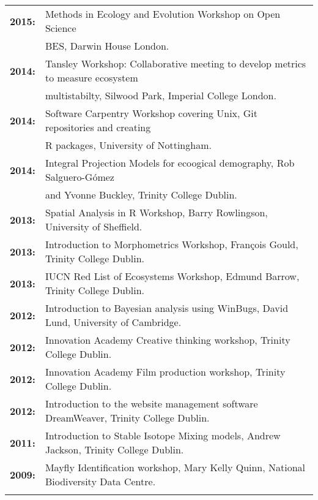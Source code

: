 \documentclass[10pt,a4paper]{article}
\begin{document}
\begin{tabular}{ll}
\textbf{2015:} & Methods in Ecology and Evolution Workshop on Open Science\\
& BES, Darwin House London.\\
\textbf{2014:} & Tansley Workshop: Collaborative meeting to develop metrics to measure ecosystem\\
&multistabilty, Silwood Park, Imperial College London.\\
\textbf{2014:} & Software Carpentry Workshop covering Unix, Git repositories and creating\\
&R packages, University of Nottingham.\\
\textbf{2014:} & Integral Projection Models for ecoogical demography, Rob Salguero-Gómez\\
&and Yvonne Buckley, Trinity College Dublin.\\
\textbf{2013:} & Spatial Analysis in R Workshop, Barry Rowlingson, University of Sheffield.\\
\textbf{2013:} & Introduction to Morphometrics Workshop, François Gould, Trinity College Dublin.\\
\textbf{2013:} & IUCN Red List of Ecosystems Workshop, Edmund Barrow, Trinity College Dublin.\\
\textbf{2012:} & Introduction to Bayesian analysis using WinBugs, David Lund, University of Cambridge.\\
\textbf{2012:} & Innovation Academy Creative thinking workshop, Trinity College Dublin.\\
\textbf{2012:} & Innovation Academy Film production workshop, Trinity College Dublin.\\
\textbf{2012:} & Introduction to the website management software DreamWeaver, Trinity College Dublin.\\
\textbf{2011:} & Introduction to Stable Isotope Mixing models, Andrew Jackson, Trinity College Dublin.\\
\textbf{2009:} & Mayfly Identification workshop, Mary Kelly Quinn, National Biodiversity Data Centre.\\
&\\
\end{tabular}
\end{document}

